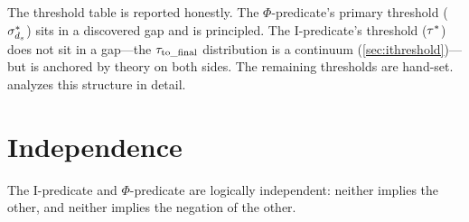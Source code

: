 \documentclass{../shared/primo}
\begin{document}
The threshold table is reported honestly. The $\Phi$-predicate's primary threshold ($\sigma^*_{d_s}$) sits in a discovered gap and is principled. The I-predicate's threshold ($\tau^*$) does not sit in a gap---the $\tau_{\mathrm{to\_final}}$ distribution is a continuum (\cref{sec:ithreshold})---but is anchored by theory on both sides. The remaining thresholds are hand-set.  analyzes this structure in detail.


\section{Independence}
\label{sec:independence}

\begin{theorem}\label{thm:independence}
The I-predicate and $\Phi$-predicate are logically independent: neither implies the other, and neither implies the negation of the other.
\end{theorem}
\end{document}
